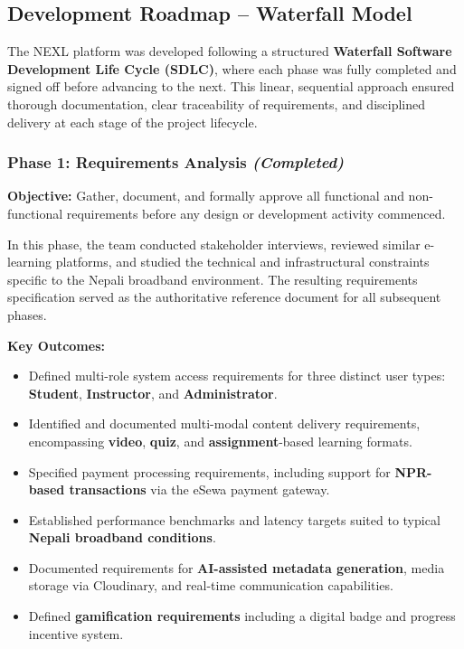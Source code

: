 
\subsection{Development Roadmap -- Waterfall Model}

The NEXL platform was developed following a structured \textbf{Waterfall Software Development Life Cycle (SDLC)}, where each phase was fully completed and signed off before advancing to the next. This linear, sequential approach ensured thorough documentation, clear traceability of requirements, and disciplined delivery at each stage of the project lifecycle.

\subsubsection*{Phase 1: Requirements Analysis \hfill \textit{(Completed)}}

\textbf{Objective:} Gather, document, and formally approve all functional and non-functional requirements before any design or development activity commenced.

In this phase, the team conducted stakeholder interviews, reviewed similar e-learning platforms, and studied the technical and infrastructural constraints specific to the Nepali broadband environment. The resulting requirements specification served as the authoritative reference document for all subsequent phases.

\textbf{Key Outcomes:}
\begin{itemize}
    \item Defined multi-role system access requirements for three distinct user types: \textbf{Student}, \textbf{Instructor}, and \textbf{Administrator}.
    \item Identified and documented multi-modal content delivery requirements, encompassing \textbf{video}, \textbf{quiz}, and \textbf{assignment}-based learning formats.
    \item Specified payment processing requirements, including support for \textbf{NPR-based transactions} via the eSewa payment gateway.
    \item Established performance benchmarks and latency targets suited to typical \textbf{Nepali broadband conditions}.
    \item Documented requirements for \textbf{AI-assisted metadata generation}, media storage via Cloudinary, and real-time communication capabilities.
    \item Defined \textbf{gamification requirements} including a digital badge and progress incentive system.
\end{itemize}

